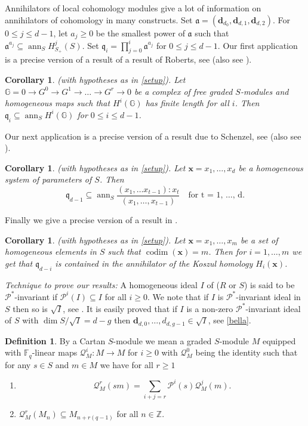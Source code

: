 \documentclass{amsart}
\newcommand{\xb}{\mathbf{x} }
\newcommand{\F}{\mathbb{F} }
\newcommand{\G}{\mathbb{G} }
\newcommand{\db}{\mathbf{d} }
\newcommand{\q}{\mathfrak{q} }
\newcommand{\A}{\mathfrak{a} }
\newcommand{\Z}{\mathbb{Z} }
\newcommand{\Pc}{\mathcal{P} }
\newcommand{\Qc}{\mathcal{Q} }
\newcommand{\rt}{\rightarrow}
\newcommand{\codim}{\operatorname{codim}}
\newcommand{\ann}{\operatorname{ann}}
\theoremstyle{plain}
\newtheorem{corollary}[theorem]{Corollary}
\theoremstyle{definition}
\newtheorem{definition}[theorem]{Definition}
\theoremstyle{remark}
\begin{document}
Annihilators of local cohomology modules give a lot of information on annihilators of cohomology in many constructs. Set $\A = (\db_{d_0}, \db_{d,1}, \db_{d,2})$. For $0 \leq j \leq d - 1$, let $a_j \geq 0$ be the smallest power of $\A$ such that $\A^{a_j}\subseteq \ann_S H^j_{S_+}(S)$. Set $\q_i = \prod_{j = 0}^{i} \A^{a_j}$ for $0 \leq j \leq d -1$. Our first application is a precise version of a result of a result of Roberts, see \cite[Theorem 1]{R} (also see \cite[8.1.2]{BH}).
\begin{corollary}
\label{rob} (with hypotheses as in \ref{setup}). Let $\G = 0 \rt G^0 \rt G^1 \rt \ldots \rt G^r \rt 0$ be a complex of free graded $S$-modules and homogeneous maps such that $H^i(\G)$ has finite length for all $i$. Then $\q_i \subseteq \ann_S H^i(\G)$ for $0 \leq i \leq d-1$.
\end{corollary}
Our next application is a precise version of a result due to Schenzel, see \cite[Theorem 2]{Sc}  (also see \cite[8.1.4]{BH}).
\begin{corollary}
\label{Sch}(with hypotheses as in \ref{setup}). Let $\xb = x_1,\dots, x_d$ be a homogeneous system of parameters of $S$. Then
$$ \q_{d-1} \subseteq \ann_S \frac{(x_1, \ldots x_{t-1})\colon x_t}{(x_1, \ldots, x_{t-1})} \quad \text{for t = 1, \ldots, d}.$$
\end{corollary}
Finally we give a precise version of a result in \cite[8.1.3]{BH}.
\begin{corollary}
\label{Sch-bh}(with hypotheses as in \ref{setup}).
Let $\xb = x_1,\dots, x_m$ be a  set of homogeneous  elements in $S$ such that $\codim (\xb) = m$. Then for $i = 1, \ldots, m$ we get that $\q_{d-i}$ is contained in the annihilator of the Koszul homology $H_i(\xb)$.
\end{corollary}
 \s \emph{Technique to prove our results:}
 A homogeneous  ideal $I$ of ($R$ or $S$) is said to be $\Pc^*$-invariant if $\Pc^i(I) \subseteq I$ for all $i \geq 0$.  We note that if $I$ is $\Pc^*$-invariant ideal in $S$ then so is $\sqrt{I}$, see \cite[11.2.5]{SL}. It is easily proved that if $I$ is a non-zero $\Pc^*$-invariant ideal of $S$ with $\dim S/\sqrt{I} = d - g$ then $\db_{d,0}, \ldots, d_{d, g -1} \in \sqrt{I}$, see \ref{bella}.
\begin{definition}
By a Cartan $S$-module we mean a graded  $S$-module $M$ equipped with $\F_q$-linear maps $\Qc^i_M \colon M \rt M$ for $i \geq 0$ with $\Qc^0_M $ being the identity such that for any $s \in S$ and $m \in M$ we have for all $r \geq 1$
\begin{enumerate}
  \item $$ \Qc^r_M(sm) = \sum_{i+j = r}\Pc^i(s)\Qc^j_M(m).$$
  \item  $\Qc^r_M(M_n) \subseteq M_{n + r(q-1)} $ for all $n \in \Z$.
\end{enumerate}
\end{definition}
\end{document}

